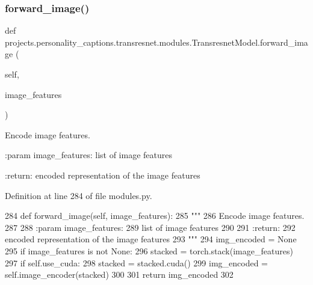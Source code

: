 \subsubsection{\texorpdfstring{forward\+\_\+image()}{forward\_image()}}
{\footnotesize\ttfamily def projects.\+personality\+\_\+captions.\+transresnet.\+modules.\+Transresnet\+Model.\+forward\+\_\+image (\begin{DoxyParamCaption}\item[{}]{self,  }\item[{}]{image\+\_\+features }\end{DoxyParamCaption})}

\begin{DoxyVerb}Encode image features.

:param image_features:
    list of image features

:return:
    encoded representation of the image features
\end{DoxyVerb}
 

Definition at line 284 of file modules.\+py.


\begin{DoxyCode}
284     \textcolor{keyword}{def }forward\_image(self, image\_features):
285         \textcolor{stringliteral}{"""}
286 \textcolor{stringliteral}{        Encode image features.}
287 \textcolor{stringliteral}{}
288 \textcolor{stringliteral}{        :param image\_features:}
289 \textcolor{stringliteral}{            list of image features}
290 \textcolor{stringliteral}{}
291 \textcolor{stringliteral}{        :return:}
292 \textcolor{stringliteral}{            encoded representation of the image features}
293 \textcolor{stringliteral}{        """}
294         img\_encoded = \textcolor{keywordtype}{None}
295         \textcolor{keywordflow}{if} image\_features \textcolor{keywordflow}{is} \textcolor{keywordflow}{not} \textcolor{keywordtype}{None}:
296             stacked = torch.stack(image\_features)
297             \textcolor{keywordflow}{if} self.use\_cuda:
298                 stacked = stacked.cuda()
299             img\_encoded = self.image\_encoder(stacked)
300 
301         \textcolor{keywordflow}{return} img\_encoded
302 
\end{DoxyCode}
\mbox{\label{classprojects_1_1personality__captions_1_1transresnet_1_1modules_1_1TransresnetModel_a5d48e4824c4b82e8c7eb25431952e988}} 
